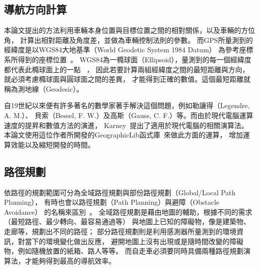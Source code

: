 \subsection{導航方向計算}
本論文提出的方法利用車輛本身位置與目標位置之間的相對關係，以及車輛的方位角，
計算出相對距離及角度差，並做為車輛控制法則的參數。
而GPS所量測到的經緯度是以WGS84大地基準（World Geodetic System 1984 Datum）
為參考座標系所得到的座標位置~\cite{Xsens:2012:MTiG_Manual}。
WGS84為一橢球面（Ellipsoid），量測到的每一個經緯度都代表此橢球面上的一點
~\cite{El-Rabbany:2006:IntroGPS}，
因此若要計算兩組經緯度之間的最短距離與方向，就必須考慮橢球面與圓球面之間的差異，
才能得到正確的數值。這個最短距離就稱為測地線（Geodesic）\cite{Karney:2013:Algorithms_for_Geodesics}。

自19世紀以來便有許多著名的數學家著手解決這個問題，例如勒讓得（Legendre, A. M.）、
貝索（Bessel, F. W.）及高斯（Gauss, C. F.）等。而由於現代電腦運算速度的提昇和數值方法的演進，
Karney~\cite{Karney:2013:Algorithms_for_Geodesics}提出了適用於現代電腦的相關演算法。
本論文使用這位作者所開發的GeographicLib函式庫~\cite{website:GeographicLib}來做此方面的運算，
增加運算效能以及縮短開發的時間。

\subsection{路徑規劃}
依路徑的規劃範圍可分為全域路徑規劃與部份路徑規劃（Global/Local Path Planning），
有時也會以路徑規劃（Path Planning）與避障（Obstacle Avoidance）
的名稱來區別~\cite{Siegwart:2004:IAMR}。
全域路徑規劃是藉由地圖的輔助，根據不同的需求（最短路徑、最少轉向、最容易通過等）
與地圖上已知的障礙物，像是建築物、走廊等，規劃出不同的路徑；
部分路徑規劃則是利用感測器所量測到的環境資訊，對當下的環境變化做出反應，
避開地圖上沒有出現或是隨時間改變的障礙物，例如隨機放置的紙箱、路人等等。
而自走車必須要同時具備兩種路徑規劃演算法，才能夠得到最高的導航效率。

